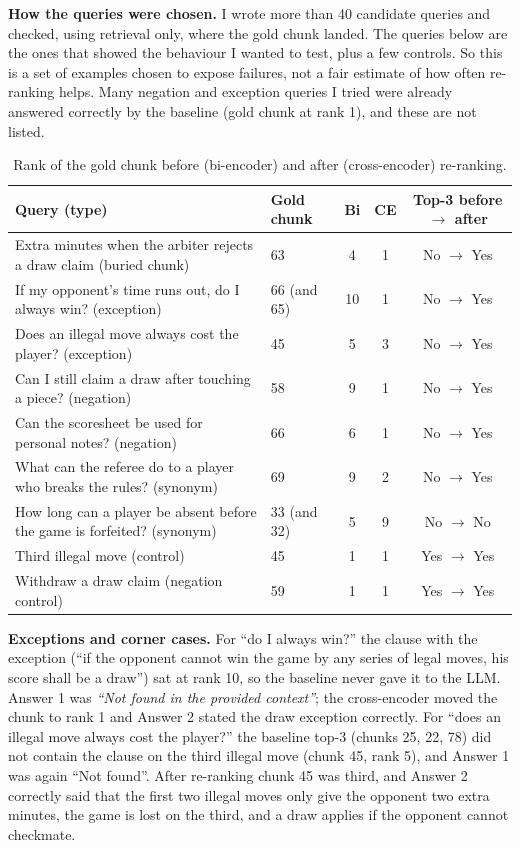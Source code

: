 \documentclass[11pt,a4paper]{article}
\begin{document}
\textbf{How the queries were chosen.} I wrote more than 40 candidate queries and checked, using retrieval only, where the gold chunk landed. The queries below are the ones that showed the behaviour I wanted to test, plus a few controls. So this is a set of examples chosen to expose failures, not a fair estimate of how often re-ranking helps. Many negation and exception queries I tried were already answered correctly by the baseline (gold chunk at rank 1), and these are not listed.

\begin{table}[h]
\centering\small
\begin{tabular}{@{}p{6.4cm}p{3.1cm}ccc@{}}
\toprule
Query (type) & Gold chunk & Bi & CE & Top-3 before $\to$ after \\
\midrule
Extra minutes when the arbiter rejects a draw claim (buried chunk) & 63 & 4 & 1 & No $\to$ Yes \\
If my opponent's time runs out, do I always win? (exception) & 66 (and 65) & 10 & 1 & No $\to$ Yes \\
Does an illegal move always cost the player? (exception) & 45 & 5 & 3 & No $\to$ Yes \\
Can I still claim a draw after touching a piece? (negation) & 58 & 9 & 1 & No $\to$ Yes \\
Can the scoresheet be used for personal notes? (negation) & 66 & 6 & 1 & No $\to$ Yes \\
What can the referee do to a player who breaks the rules? (synonym) & 69 & 9 & 2 & No $\to$ Yes \\
How long can a player be absent before the game is forfeited? (synonym) & 33 (and 32) & 5 & 9 & No $\to$ No \\
Third illegal move (control) & 45 & 1 & 1 & Yes $\to$ Yes \\
Withdraw a draw claim (negation control) & 59 & 1 & 1 & Yes $\to$ Yes \\
\bottomrule
\end{tabular}
\caption{Rank of the gold chunk before (bi-encoder) and after (cross-encoder) re-ranking.}
\label{tab:ranks}
\end{table}

\textbf{Exceptions and corner cases.} For ``do I always win?'' the clause with the exception (``if the opponent cannot win the game by any series of legal moves, his score shall be a draw'') sat at rank 10, so the baseline never gave it to the LLM. Answer 1 was \emph{``Not found in the provided context''}; the cross-encoder moved the chunk to rank 1 and Answer 2 stated the draw exception correctly. For ``does an illegal move always cost the player?'' the baseline top-3 (chunks 25, 22, 78) did not contain the clause on the third illegal move (chunk 45, rank 5), and Answer 1 was again ``Not found''. After re-ranking chunk 45 was third, and Answer 2 correctly said that the first two illegal moves only give the opponent two extra minutes, the game is lost on the third, and a draw applies if the opponent cannot checkmate.
\end{document}
